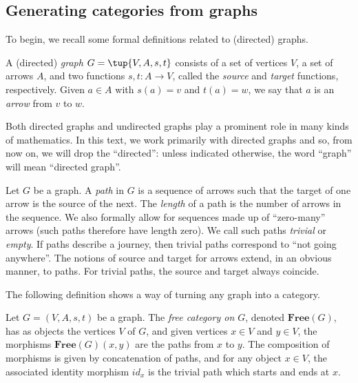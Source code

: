 \subsection{Generating categories from graphs}

To begin, we recall some formal definitions related to (directed) graphs. 

\begin{definition}[Graph]
A (directed) \emph{graph} $G=\tup{V,A,s,t}$ consists of a set of vertices $V$, a set of arrows $A$, and two functions $s,t\colon A\to V$, called the \emph{source} and \emph{target} functions, respectively. Given $a\in A$ with $s(a)=v$ and $t(a)=w$, we say that $a$ is an \emph{arrow} from $v$ to $w$. 
\end{definition}

\begin{remark}
Both directed graphs and undirected graphs play a prominent role in many kinds of mathematics. In this text, we work primarily with directed graphs and so, from now on, we will drop the ``directed'': unless indicated otherwise, the word ``graph'' will mean ``directed graph''. 
\end{remark}

\begin{definition}[Paths]
Let $G$ be a graph. A \emph{path} in $G$ is a sequence of arrows such that the target of one arrow is the source of the next. The \emph{length} of a path is the number of arrows in the sequence. We also formally allow for sequences made up of ``zero-many'' arrows (such paths therefore have length zero). We call such paths \emph{trivial} or \emph{empty}. If paths describe a journey, then trivial paths correspond to ``not going anywhere''.  The notions of source and target for arrows extend, in an obvious manner, to paths. For trivial paths, the source and target always coincide. 
\end{definition}

The following definition shows a way of turning any graph into a category. 

\begin{shaded}
\begin{definition}
Let $G=(V,A,s,t)$ be a graph. The \emph{free category on $G$}, denoted $\mathbf{Free}(G)$, has as objects the vertices $V$ of $G$, and given vertices $x\in V$ and $y\in V$, the morphisms $\mathbf{Free}(G)(x,y)$ are the paths from $x$ to $y$. 
The composition of morphisms is given by concatenation of paths, and for any object $x \in V$, the associated identity morphism $id_x$ is the trivial path which starts and ends at $x$. 
\end{definition}
\end{shaded}

